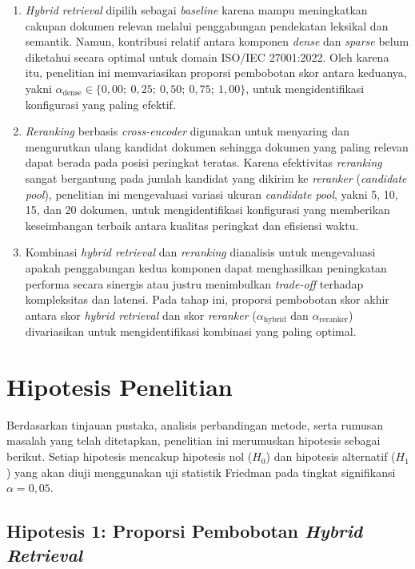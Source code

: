 \begin{enumerate}
	\item \textit{Hybrid retrieval} dipilih sebagai \textit{baseline} karena mampu meningkatkan cakupan dokumen relevan melalui penggabungan pendekatan leksikal dan semantik. Namun, kontribusi relatif antara komponen \textit{dense} dan \textit{sparse} belum diketahui secara optimal untuk domain ISO/IEC 27001:2022. Oleh karena itu, penelitian ini memvariasikan proporsi pembobotan skor antara keduanya, yakni $\alpha_{\text{dense}} \in \{0{,}00;\ 0{,}25;\ 0{,}50;\ 0{,}75;\ 1{,}00\}$, untuk mengidentifikasi konfigurasi yang paling efektif.
	\item \textit{Reranking} berbasis \textit{cross-encoder} digunakan untuk menyaring dan mengurutkan ulang kandidat dokumen sehingga dokumen yang paling relevan dapat berada pada posisi peringkat teratas. Karena efektivitas \textit{reranking} sangat bergantung pada jumlah kandidat yang dikirim ke \textit{reranker} (\textit{candidate pool}), penelitian ini mengevaluasi variasi ukuran \textit{candidate pool}, yakni 5, 10, 15, dan 20 dokumen, untuk mengidentifikasi konfigurasi yang memberikan keseimbangan terbaik antara kualitas peringkat dan efisiensi waktu.
	\item Kombinasi \textit{hybrid retrieval} dan \textit{reranking} dianalisis untuk mengevaluasi apakah penggabungan kedua komponen dapat menghasilkan peningkatan performa secara sinergis atau justru menimbulkan \textit{trade-off} terhadap kompleksitas dan latensi. Pada tahap ini, proporsi pembobotan skor akhir antara skor \textit{hybrid retrieval} dan skor \textit{reranker} ($\alpha_{\text{hybrid}}$ dan $\alpha_{\text{reranker}}$) divariasikan untuk mengidentifikasi kombinasi yang paling optimal.
\end{enumerate}

\section{Hipotesis Penelitian}

Berdasarkan tinjauan pustaka, analisis perbandingan metode, serta rumusan masalah yang telah ditetapkan, penelitian ini merumuskan hipotesis sebagai berikut. Setiap hipotesis mencakup hipotesis nol ($H_0$) dan hipotesis alternatif ($H_1$) yang akan diuji menggunakan uji statistik Friedman pada tingkat signifikansi $\alpha = 0{,}05$.

\subsection*{Hipotesis 1: Proporsi Pembobotan \textit{Hybrid Retrieval}}

